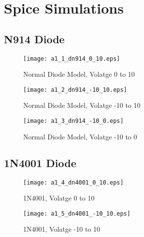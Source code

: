 

\section{Spice Simulations}

\subsection{N914 Diode}
	\begin{figure}[hb!]
		\centering
		\texttt{[image: a1\_1\_dn914\_0\_10.eps]}
		\caption{Normal Diode Model, Volatge 0 to 10}
		\label{fig:nd1}
	\end{figure}

	\begin{framed}
	
	\end{framed}

	\begin{figure}[hb!]
		\centering
		\texttt{[image: a1\_2\_dn914\_-10\_10.eps]}
		\caption{Normal Diode Model, Volatge -10 to 10}
		\label{fig:nd2}
	\end{figure}

	\begin{framed}
	
	\end{framed}

	\begin{figure}[hb!]
		\centering
		\texttt{[image: a1\_3\_dn914\_-10\_0.eps]}
		\caption{Normal Diode Model, Volatge -10 to 0}
		\label{fig:nd3}
	\end{figure}

	\begin{framed}
	
	\end{framed}
\subsection{1N4001 Diode}

	\begin{figure}[hb!]
		\centering
		\texttt{[image: a1\_4\_dn4001\_0\_10.eps]}
		\caption{1N4001, Volatge 0 to 10}
		\label{fig:1n1}
	\end{figure}
	\begin{framed}
	
	\end{framed}

	\begin{figure}[hb!]
		\centering
		\texttt{[image: a1\_5\_dn4001\_-10\_10.eps]}
		\caption{1N4001, Volatge -10 to 10}
		\label{fig:1n2}
	\end{figure}
	\begin{framed}
	
	\end{framed}

